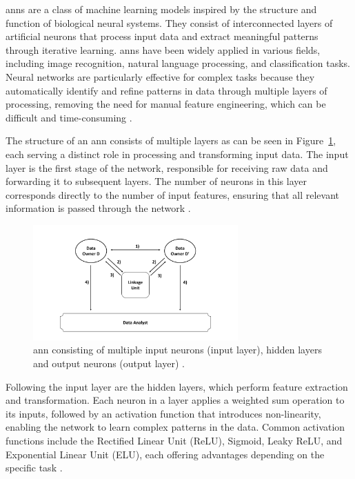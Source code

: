 \ac{ann}s are a class of machine learning models inspired by the structure and function of biological neural systems.
They consist of interconnected layers of artificial neurons that process input data and extract meaningful patterns through iterative learning.
\ac{ann}s have been widely applied in various fields, including image recognition, natural language processing, and classification tasks.
Neural networks are particularly effective for complex tasks because they automatically identify and refine patterns in data through multiple layers of processing, removing the need for manual feature engineering, which can be difficult and time-consuming \cite{dongare2012introduction}.

The structure of an \ac{ann} consists of multiple layers as can be seen in Figure~\ref{fig:annexample}, each serving a distinct role in processing and transforming input data.
The input layer is the first stage of the network, responsible for receiving raw data and forwarding it to subsequent layers.
The number of neurons in this layer corresponds directly to the number of input features, ensuring that all relevant information is passed through the network \cite{dongare2012introduction}.

\begin{figure}[H]
  \centering
  \includegraphics[width=0.7\textwidth, page=16]{img/visualization.pdf}
  \caption{\ac{ann} consisting of multiple input neurons (input layer), hidden layers and output neurons (output layer) \cite{annimage}.}
  \label{fig:annexample}
\end{figure}


Following the input layer are the hidden layers, which perform feature extraction and transformation.
Each neuron in a layer applies a weighted sum operation to its inputs, followed by an activation function that introduces non-linearity, enabling the network to learn complex patterns in the data. Common activation functions include the Rectified Linear Unit (ReLU), Sigmoid, Leaky ReLU, and Exponential Linear Unit (ELU), each offering advantages depending on the specific task \cite{sharma2017activation,russell2016artificial}.

